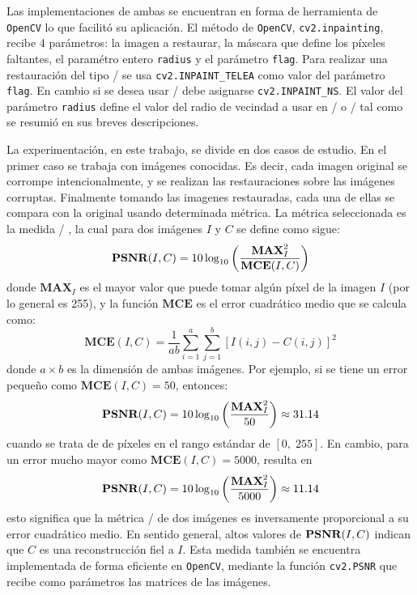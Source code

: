 Las implementaciones de ambas se encuentran en forma de herramienta de \texttt{OpenCV} lo que facilit\'o su aplicaci\'on. El m\'etodo de \texttt{OpenCV}, \texttt{cv2.inpainting}, recibe 4 par\'ametros: la imagen a restaurar, la m\'ascara que define los p\'ixeles faltantes, el param\'etro entero \texttt{radius} y el par\'ametro \texttt{flag}. Para realizar una restauraci\'on del tipo \TELEA/ se usa \texttt{cv2.INPAINT\_TELEA} como valor del par\'ametro \texttt{flag}. En cambio si se desea usar \NS/ debe asignarse \texttt{cv2.INPAINT\_NS}. El valor del par\'ametro \texttt{radius} define el valor del radio de vecindad a usar en \TELEA/ o \NS/ tal como se resumi\'o en sus breves descripciones.

La experimentaci\'on, en este trabajo, se divide en dos casos de estudio. En el primer caso se trabaja con im\'agenes conocidas. Es decir, cada imagen original se corrompe intencionalmente, y se realizan las restauraciones sobre las im\'agenes corruptas. Finalmente tomando las imagenes restauradas, cada una de ellas se compara con la original usando determinada m\'etrica. La m\'etrica seleccionada es la medida \PSNR/ \cite{korhonen2012peak}, la cual para dos im\'agenes $I$ y $C$ se define como sigue:
\begin{equation}
	\PSNR/(I, C) = 10 \log_{10} \left(\frac{\textbf{MAX}^2_I}{\textbf{MCE}(I, C)}\right)
\end{equation}
donde $\textbf{MAX}_I$ es el mayor valor que puede tomar alg\'un p\'ixel de la imagen $I$ (por lo general es 255), y la funci\'on $\textbf{MCE}$ es el error cuadr\'atico medio que se calcula como:
\begin{equation}
	\textbf{MCE}(I, C) = \frac{1}{ab}\sum_{i=1}^{a}\sum_{j=1}^{b}[I(i, j) - C(i, j)]^2
\end{equation}
donde $a \times b$ es la dimensi\'on de ambas im\'agenes. Por ejemplo, si se tiene un error pequeño como $\textbf{MCE}(I, C) = 50$, entonces: $$\PSNR/(I, C) = 10 \log_{10} \left(\frac{\textbf{MAX}^2_I}{50}\right) \approx 31.14$$ cuando se trata de de p\'ixeles en el rango est\'andar de $[0,\;255]$. En cambio, para un error mucho mayor como $\textbf{MCE}(I, C) = 5000$, resulta en $$\PSNR/(I, C) = 10 \log_{10} \left(\frac{\textbf{MAX}^2_I}{5000}\right) \approx 11.14$$ esto significa que la m\'etrica \PSNR/ de dos im\'agenes es inversamente proporcional a su error cuadr\'atico medio. En sentido general, altos valores de $\PSNR/(I, C)$ indican que $C$ es una reconstrucción fiel a $I$. Esta medida tambi\'en se encuentra implementada de forma eficiente en \texttt{OpenCV}, mediante la funci\'on \texttt{cv2.PSNR} que recibe como par\'ametros las matrices de las im\'agenes.

